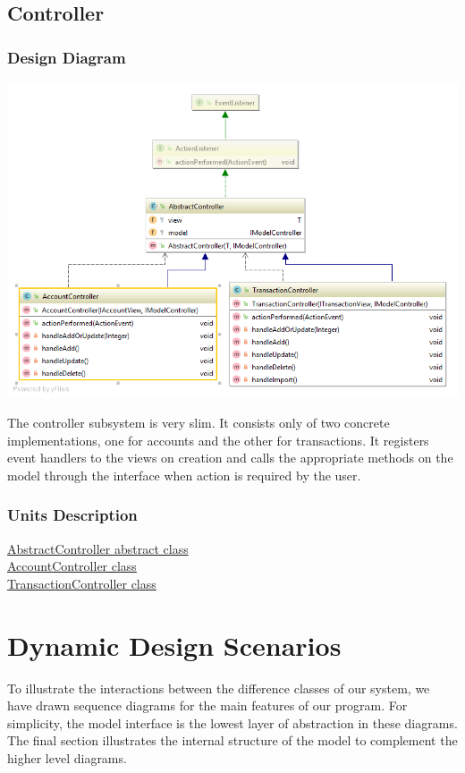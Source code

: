 \documentclass[12pt]{article}
\begin{document}
\subsection{Controller}

\subsubsection{Design Diagram}

\includegraphics[width=\textwidth,height=\textheight,keepaspectratio]{Diagrams/UML/Controller.png}
\bigskip

The controller subsystem is very slim. It consists only of two concrete implementations, one for accounts and the other for transactions. It registers event handlers to the views on creation and calls the appropriate methods on the model through the  interface when action is required by the user.

\subsubsection{Units Description}

\href{run:javadoc/AbstractController.html}{AbstractController abstract class}\\
\href{run:javadoc/AccountController.html}{AccountController class}\\
\href{run:javadoc/TransactionController.html}{TransactionController class}\\

\newpage
\section{Dynamic Design Scenarios}
To illustrate the interactions between the difference classes of our system, we have drawn sequence diagrams for the main features of our program. For simplicity, the model interface is the lowest layer of abstraction in these diagrams. The final section illustrates the internal structure of the model to complement the higher level diagrams.
\end{document}
